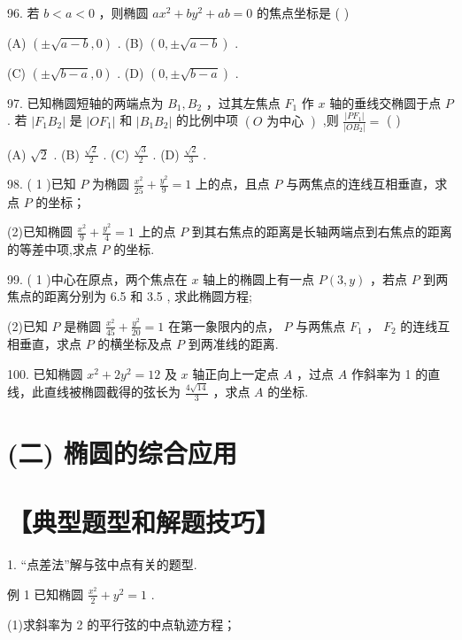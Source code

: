 \documentclass[10pt]{article}
\begin{document}
96. 若 \(b < a < 0\) ，则椭圆 \(a{x}^{2} + b{y}^{2} + {ab} = 0\) 的焦点坐标是 ( )

(A) \(\left( {\pm \sqrt{a - b},0}\right)\) . (B) \(\left( {0, \pm  \sqrt{a - b}}\right)\) .

(C) \(\left( {\pm \sqrt{b - a},0}\right)\) . (D) \(\left( {0, \pm  \sqrt{b - a}}\right)\) .

97. 已知椭圆短轴的两端点为 \({B}_{1},{B}_{2}\) ，过其左焦点 \({F}_{1}\) 作 \(x\) 轴的垂线交椭圆于点 \(P\) . 若 \(\left| {{F}_{1}{B}_{2}}\right|\) 是 \(\left| {O{F}_{1}}\right|\) 和 \(\left| {{B}_{1}{B}_{2}}\right|\) 的比例中项 \(\left( {O\text{ 为中心 }}\right)\) ,则 \(\frac{\left| P{F}_{1}\right| }{\left| O{B}_{2}\right| } =\) (   )

(A) \(\sqrt{2}\) . (B) \(\frac{\sqrt{2}}{2}\) . (C) \(\frac{\sqrt{3}}{2}\) . (D) \(\frac{\sqrt{2}}{3}\) .

98. ( 1 )已知 \(P\) 为椭圆 \(\frac{{x}^{2}}{25} + \frac{{y}^{2}}{9} = 1\) 上的点，且点 \(P\) 与两焦点的连线互相垂直，求点 \(P\) 的坐标；

(2)已知椭圆 \(\frac{{x}^{2}}{9} + \frac{{y}^{2}}{4} = 1\) 上的点 \(P\) 到其右焦点的距离是长轴两端点到右焦点的距离的等差中项,求点 \(P\) 的坐标.

99. ( 1 )中心在原点，两个焦点在 \(x\) 轴上的椭圆上有一点 \(P\left( {3,y}\right)\) ，若点 \(P\) 到两焦点的距离分别为 6.5 和 3.5 , 求此椭圆方程;

(2)已知 \(P\) 是椭圆 \(\frac{{x}^{2}}{45} + \frac{{y}^{2}}{20} = 1\) 在第一象限内的点， \(P\) 与两焦点 \({F}_{1}\) ， \({F}_{2}\) 的连线互相垂直，求点 \(P\) 的横坐标及点 \(P\) 到两准线的距离.

100. 已知椭圆 \({x}^{2} + 2{y}^{2} = {12}\) 及 \(x\) 轴正向上一定点 \(A\) ，过点 \(A\) 作斜率为 1 的直线，此直线被椭圆截得的弦长为 \(\frac{4\sqrt{14}}{3}\) ，求点 \(A\) 的坐标.

\section*{(二) 椭圆的综合应用}

\section*{【典型题型和解题技巧】}

1. “点差法”解与弦中点有关的题型.

例 1 已知椭圆 \(\frac{{x}^{2}}{2} + {y}^{2} = 1\) .

(1)求斜率为 2 的平行弦的中点轨迹方程；
\end{document}
